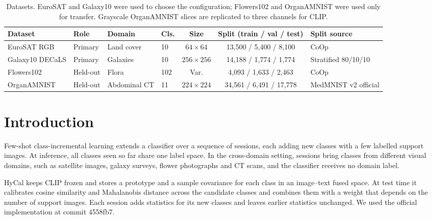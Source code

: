 \documentclass[letterpaper]{article} %
\begin{document}
\begin{table}[t]
\centering
\footnotesize
\setlength{\tabcolsep}{3pt}
\begin{tabular}{@{}llllccl@{}}
\toprule
Dataset & Role & Domain & Cls. & Size & Split (train / val / test) & Split source \\
\midrule
EuroSAT RGB \citep{helber2019eurosat} & Primary & Land cover & 10 & $64{\times}64$ & 13,500 / 5,400 / 8,100 & CoOp \citep{zhou2022coop} \\
Galaxy10 DECaLS \citep{galaxy10} & Primary & Galaxies & 10 & $256{\times}256$ & 14,188 / 1,774 / 1,774 & Stratified 80/10/10 \\
Flowers102 \citep{nilsback2008flowers} & Held-out & Flora & 102 & Var. & 4,093 / 1,633 / 2,463 & CoOp \citep{zhou2022coop} \\
OrganAMNIST \citep{yang2023medmnist} & Held-out & Abdominal CT & 11 & $224{\times}224$ & 34,561 / 6,491 / 17,778 & MedMNIST v2 official \\
\bottomrule
\end{tabular}
\caption{Datasets. EuroSAT and Galaxy10 were used to choose the configuration; Flowers102 and OrganAMNIST were used only for transfer. Grayscale OrganAMNIST slices are replicated to three channels for CLIP.}
\label{tab:data}
\end{table}

\section{Introduction}

Few-shot class-incremental learning extends a classifier over a sequence of sessions, each adding new classes with a few labelled support images. At inference, all classes seen so far share one label space. In the cross-domain setting, sessions bring classes from different visual domains, such as satellite images, galaxy surveys, flower photographs and CT scans, and the classifier receives no domain label.

HyCal \citep{lee2026hycal} keeps CLIP \citep{radford2021clip} frozen and stores a prototype and a sample covariance for each class in an image--text fused space. At test time it calibrates cosine similarity and Mahalanobis distance across the candidate classes and combines them with a weight that depends on the number of support images. Each session adds statistics for its new classes and leaves earlier statistics unchanged. We used the official implementation \citep{hycalcode} at commit 4558fb7.
\end{document}
